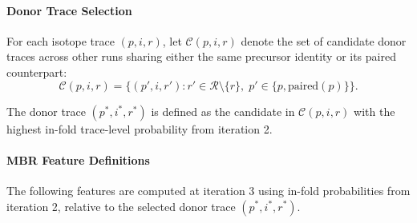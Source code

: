 \documentclass[pdflatex,sn-nature]{sn-jnl}
\begin{document}
\paragraph{Donor Trace Selection}\label{para:paired-precursor-identification} 

For each isotope trace $(p,i,r)$, let $\mathcal{C}(p,i,r)$ denote the set of candidate donor traces across other runs sharing either the same precursor identity or its paired counterpart:
\begin{equation}
\mathcal{C}(p,i,r) =
\{(p', i, r') : r' \in \mathcal{R} \setminus \{r\},\; p' \in \{p, \text{paired}(p)\}\}.
\end{equation}

The donor trace $(p^*, i^*, r^*)$ is defined as the candidate in $\mathcal{C}(p,i,r)$ with the highest in-fold trace-level probability from iteration 2.

\paragraph{MBR Feature Definitions}

The following features are computed at iteration 3 using in-fold probabilities from iteration 2, relative to the selected donor trace $(p^*,i^*,r^*)$.
\end{document}
